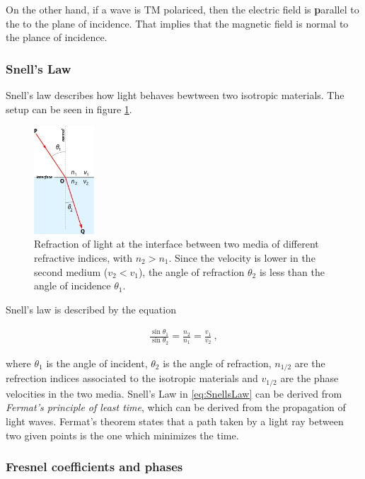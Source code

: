 On the other hand, if a wave is TM polariced, then the electric field is \textbf{p}arallel to the to the plane of incidence. That implies that the magnetic field is normal to the plance of incidence.

\subsubsection{Snell's Law}

Snell's law describes how light behaves bewtween two isotropic materials. The setup can be seen in figure \ref{fig:snellsLaw}.

\begin{figure}[h!]
    \centering
    \includegraphics[width=0.2\textwidth]{figures/SnellsLaw2.png}
    \caption{Refraction of light at the interface between two media of different refractive indices, with $n_2 > n_1$. Since the velocity is lower in the second medium ($v_2 < v_1$), the angle of refraction $\theta_2$ is less than the angle of incidence $\theta_1$.}
    \label{fig:snellsLaw}
\end{figure}

Snell's law is described by the equation 

\begin{align}
\frac{\sin \theta_1}{\sin \theta_2} = \frac{n_2}{n_1} = \frac{v_1}{v_2}~,
\label{eq:SnellsLaw}
\end{align}

where $\theta_1$ is the angle of incident, $\theta_2$ is the angle of refraction, $n_{1/2}$ are the refrection indices associated to the isotropic materials and $v_{1/2}$ are the phase velocities in the two media. Snell's Law in \ref{eq:SnellsLaw} can be derived from \textit{Fermat's principle of least time}, which can be derived from the propagation of light waves. Fermat's theorem states that a path taken by a light ray between two given points is the one which minimizes the time.

\subsubsection{Fresnel coefficients and phases}

